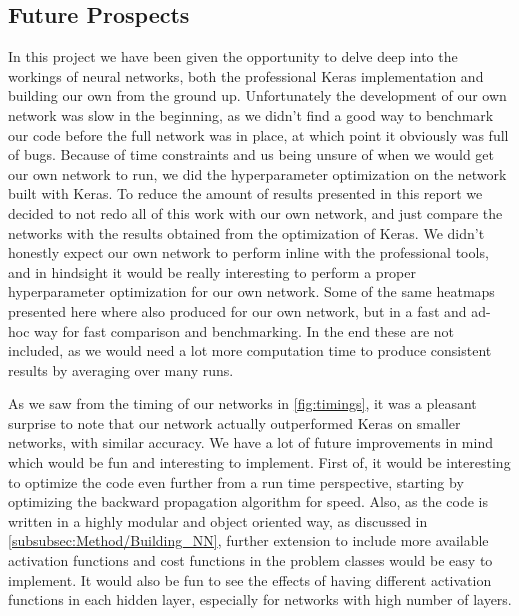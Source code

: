 \documentclass[10pt, twocolumn]{article}
\begin{document}
\subsection{Future Prospects}
In this project we have been given the opportunity to delve deep into the workings of neural networks, both the professional Keras implementation and building our own from the ground up. Unfortunately the development of our own network was slow in the beginning, as we didn't find a good way to benchmark our code before the full network was in place, at which point it obviously was full of bugs. Because of time constraints and us being unsure of when we would get our own network to run, we did the hyperparameter optimization on the network built with Keras. To reduce the amount of results presented in this report we decided to not redo all of this work with our own network, and just compare the networks with the results obtained from the optimization of Keras. We didn't honestly expect our own network to perform inline with the professional tools, and in hindsight it would be really interesting to perform a proper hyperparameter optimization for our own network. Some of the same heatmaps presented here where also produced for our own network, but in a fast and ad-hoc way for fast comparison and benchmarking. In the end these are not included, as we would need a lot more computation time to produce consistent results by averaging over many runs.

As we saw from the timing of our networks in \cref{fig:timings}, it was a pleasant surprise to note that our network actually outperformed Keras on smaller networks, with similar accuracy. We have a lot of future improvements in mind which would be fun and interesting to implement. First of, it would be interesting to optimize the code even further from a run time perspective, starting by optimizing the backward propagation algorithm for speed. Also, as the code is written in a highly modular and object oriented way, as discussed in \cref{subsubsec:Method/Building_NN}, further extension to include more available activation functions and cost functions in the problem classes would be easy to implement. It would also be fun to see the effects of having different activation functions in each hidden layer, especially for networks with high number of layers.
\end{document}
